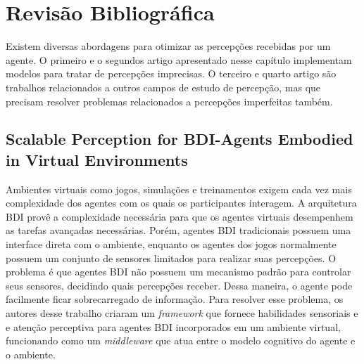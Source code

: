 \chapter{Revisão Bibliográfica}

Existem diversas abordagens para otimizar as percepções recebidas por um agente. O primeiro e o segundos artigo apresentado nesse capítulo implementam modelos para tratar de percepções imprecisas. O terceiro e quarto artigo são trabalhos relacionados a outros campos de estudo de percepção, mas que precisam resolver problemas relacionados a percepções imperfeitas também.

\section{Scalable Perception for BDI-Agents Embodied in Virtual Environments \cite{van2011scalable}}

Ambientes virtuais como jogos, simulações e treinamentos exigem cada vez mais complexidade dos agentes com os quais os participantes interagem. A arquitetura BDI provê a complexidade necessária para que os agentes virtuais desempenhem as tarefas avançadas necessárias. Porém, agentes BDI tradicionais possuem uma interface direta com o ambiente, enquanto os agentes dos jogos normalmente possuem um conjunto de sensores limitados para realizar suas percepções. O problema é que agentes BDI não possuem um mecanismo padrão para controlar seus sensores, decidindo quais percepções receber. Dessa maneira, o agente pode facilmente ficar sobrecarregado de informação. Para resolver esse problema, os autores desse trabalho criaram um \textit{framework} que fornece habilidades sensoriais e e atenção perceptiva para agentes BDI incorporados em um ambiente virtual, funcionando como um \textit{middleware} que atua entre o modelo cognitivo do agente e o ambiente.

